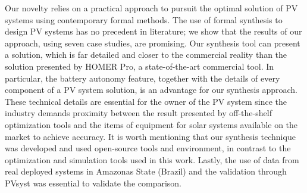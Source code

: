 \documentclass[runningheads]{llncs}
\begin{document}
Our novelty relies on a practical approach to pursuit the optimal solution of PV systems using contemporary formal methods. The use of formal synthesis to design PV systems has no precedent in literature; we show that the results of our approach, using seven case studies, are promising. Our synthesis tool can present a solution, which is far detailed and closer to the commercial reality than the solution presented by HOMER Pro, a state-of-the-art commercial tool. In particular, the battery autonomy feature, together with the details of every component of a PV system solution, is an advantage for our synthesis approach. These technical details are essential for the owner of the PV system since the industry demands proximity between the result presented by off-the-shelf optimization tools and the items of equipment for solar systems available on the market to achieve accuracy. It is worth mentioning that our synthesis technique was developed and used open-source tools and environment, in contrast to the optimization and simulation tools used in this work. Lastly, the use of data from real deployed systems in Amazonas State (Brazil) and the validation through PVsyst was essential to validate the comparison.

%
%


%
\end{document}
